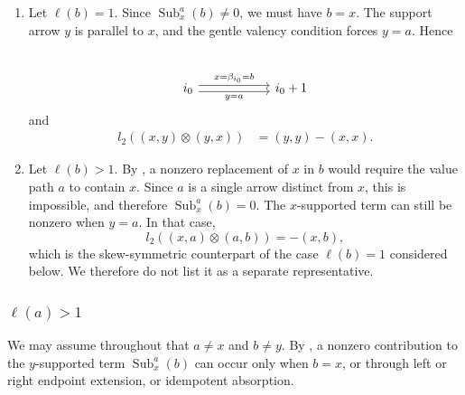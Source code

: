 \documentclass[11pt,a4paper,reqno]{amsart}
\newcommand{\Sub}{\operatorname{Sub}}
\newcommand{\para}[2]{(#1,#2)}
\newcommand{\bi}{\beta_{i_0}}
\theoremstyle{plain}
\theoremstyle{definition}
\numberwithin{equation}{section}
\begin{document}
	\begin{enumerate}
		\item Let $\ell(b)=1$.  Since $\Sub_x^a(b)\neq0$, we must have $b=x$.  The support
		arrow $y$ is parallel to $x$, and the gentle valency condition forces
		$y=a$.  Hence
		\[
		\begin{tikzcd}
			& {} & \\
			{i_0} && {i_0+1}
			\arrow["{x=\bi=b}", shift left, from=2-1, to=2-3]
			\arrow["{y=a}"', shift right, from=2-1, to=2-3]
		\end{tikzcd}
		\]
		and
		\begin{align}
			l_2(\para{x}{y}\otimes\para{y}{x})
			&=
			\para{y}{y}-\para{x}{x}.
			\label{eq:xneqy-parallel-swap}
		\end{align}
		
		\item Let $\ell(b)>1$.  By , a
		nonzero replacement of $x$ in $b$ would require the value path $a$ to
		contain $x$.  Since $a$ is a single arrow distinct from $x$, this is
		impossible, and therefore
		$\Sub_x^a(b)=0$.
		The $x$-supported term can still be nonzero when $y=a$.  In that case,
		\[
		l_2(\para{x}{a}\otimes\para{a}{b})=-\para{x}{b},
		\]
		which is the skew-symmetric counterpart of the case $\ell(b)=1$
		considered below.  We therefore do not list it as a
		separate representative.
	\end{enumerate}
	
	\subsubsection{$\ell(a)>1$}\label{subsec:xneqy-ella-gt-one}
	We may assume throughout that $a\neq x$ and $b\neq y$.  By
	, a nonzero contribution to the $y$-supported term $\Sub_x^a(b)$ can occur only when $b=x$, or through left or
	right endpoint extension, or idempotent absorption.
	
\end{document}
